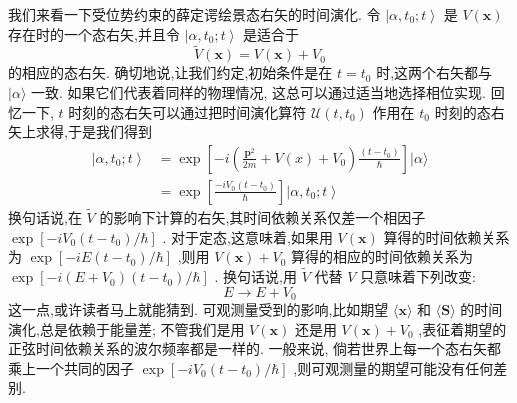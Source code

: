 我们来看一下受位势约束的薛定谔绘景态右矢的时间演化. 令 $\left| {\alpha ,{t}_{0};t}\right\rangle$ 是 $V\left( \mathbf{x}\right)$ 存在时的一个态右矢,并且令 $\left| {\alpha ,{t}_{0};t}\right\rangle$ 是适合于
\begin{equation}
\widetilde{V}\left( \mathbf{x}\right) = V\left( \mathbf{x}\right) + {V}_{0}
\end{equation}
的相应的态右矢. 确切地说,让我们约定,初始条件是在 $t = {t}_{0}$ 时,这两个右矢都与 $|\alpha \rangle$ 一致. 如果它们代表着同样的物理情况, 这总可以通过适当地选择相位实现. 回忆一下, $t$ 时刻的态右矢可以通过把时间演化算符 $\mathcal{U}\left( {t,{t}_{0}}\right)$ 作用在 ${t}_{0}$ 时刻的态右矢上求得,于是我们得到
\begin{equation}
\begin{aligned}
	\left| {\alpha ,{t}_{0};t}\right\rangle &= \exp \left\lbrack {-i\left( {\frac{{\mathbf{p}}^{2}}{2m} + V\left( x\right) + {V}_{0}}\right) \frac{\left( t - {t}_{0}\right) }{\hbar }}\right\rbrack |\alpha \rangle\\
	&= \exp \left\lbrack \frac{-i{V}_{0}\left( {t - {t}_{0}}\right) }{\hbar }\right\rbrack \left| {\alpha ,{t}_{0};t}\right\rangle
\end{aligned}
\end{equation}
换句话说,在 $\widetilde{V}$ 的影响下计算的右矢,其时间依赖关系仅差一个相因子 $\exp \left\lbrack {-i{V}_{0}\left( {t - {t}_{0}}\right) /\hbar }\right\rbrack$ . 对于定态,这意味着,如果用 $V\left( \mathbf{x}\right)$ 算得的时间依赖关系为 $\exp \left\lbrack {-{iE}\left( {t - {t}_{0}}\right) /\hbar }\right\rbrack$ ,则用 $V\left( \mathbf{x}\right) + {V}_{0}$ 算得的相应的时间依赖关系为 $\exp \left\lbrack {-i\left( {E + {V}_{0}}\right) \left( {t - {t}_{0}}\right) /\hbar }\right\rbrack$ . 换句话说,用 $\widetilde{V}$ 代替 $V$ 只意味着下列改变:
\begin{equation}
E \rightarrow E + {V}_{0}
\end{equation}
这一点,或许读者马上就能猜到. 可观测量受到的影响,比如期望 $\langle \mathbf{x}\rangle$ 和 $\langle \mathbf{S}\rangle$ 的时间演化,总是依赖于能量差; 不管我们是用 $V\left( \mathbf{x}\right)$ 还是用 $V\left( \mathbf{x}\right) + {V}_{0}$ ,表征着期望的正弦时间依赖关系的波尔频率都是一样的. 一般来说, 倘若世界上每一个态右矢都乘上一个共同的因子 $\exp \left\lbrack {-i{V}_{0}\left( {t - {t}_{0}}\right) /\hbar }\right\rbrack$ ,则可观测量的期望可能没有任何差别.


